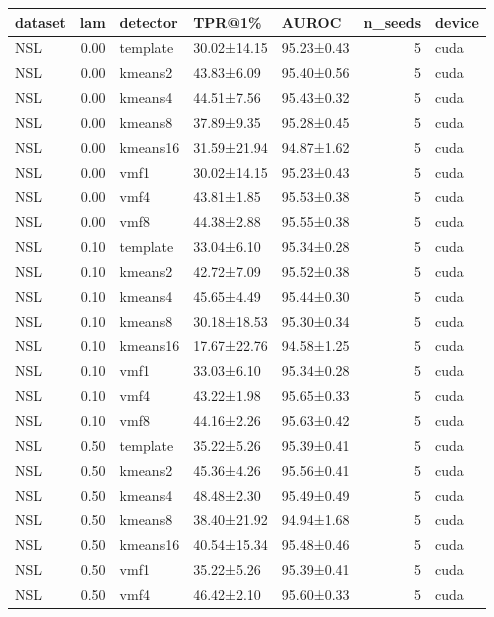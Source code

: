 \begin{tabular}{lrlllrl}
\toprule
dataset & lam & detector & TPR@1\% & AUROC & n\_seeds & device \\
\midrule
NSL & 0.00 & template & 30.02±14.15 & 95.23±0.43 & 5 & cuda \\
NSL & 0.00 & kmeans2 & 43.83±6.09 & 95.40±0.56 & 5 & cuda \\
NSL & 0.00 & kmeans4 & 44.51±7.56 & 95.43±0.32 & 5 & cuda \\
NSL & 0.00 & kmeans8 & 37.89±9.35 & 95.28±0.45 & 5 & cuda \\
NSL & 0.00 & kmeans16 & 31.59±21.94 & 94.87±1.62 & 5 & cuda \\
NSL & 0.00 & vmf1 & 30.02±14.15 & 95.23±0.43 & 5 & cuda \\
NSL & 0.00 & vmf4 & 43.81±1.85 & 95.53±0.38 & 5 & cuda \\
NSL & 0.00 & vmf8 & 44.38±2.88 & 95.55±0.38 & 5 & cuda \\
NSL & 0.10 & template & 33.04±6.10 & 95.34±0.28 & 5 & cuda \\
NSL & 0.10 & kmeans2 & 42.72±7.09 & 95.52±0.38 & 5 & cuda \\
NSL & 0.10 & kmeans4 & 45.65±4.49 & 95.44±0.30 & 5 & cuda \\
NSL & 0.10 & kmeans8 & 30.18±18.53 & 95.30±0.34 & 5 & cuda \\
NSL & 0.10 & kmeans16 & 17.67±22.76 & 94.58±1.25 & 5 & cuda \\
NSL & 0.10 & vmf1 & 33.03±6.10 & 95.34±0.28 & 5 & cuda \\
NSL & 0.10 & vmf4 & 43.22±1.98 & 95.65±0.33 & 5 & cuda \\
NSL & 0.10 & vmf8 & 44.16±2.26 & 95.63±0.42 & 5 & cuda \\
NSL & 0.50 & template & 35.22±5.26 & 95.39±0.41 & 5 & cuda \\
NSL & 0.50 & kmeans2 & 45.36±4.26 & 95.56±0.41 & 5 & cuda \\
NSL & 0.50 & kmeans4 & 48.48±2.30 & 95.49±0.49 & 5 & cuda \\
NSL & 0.50 & kmeans8 & 38.40±21.92 & 94.94±1.68 & 5 & cuda \\
NSL & 0.50 & kmeans16 & 40.54±15.34 & 95.48±0.46 & 5 & cuda \\
NSL & 0.50 & vmf1 & 35.22±5.26 & 95.39±0.41 & 5 & cuda \\
NSL & 0.50 & vmf4 & 46.42±2.10 & 95.60±0.33 & 5 & cuda \\

\end{tabular}
